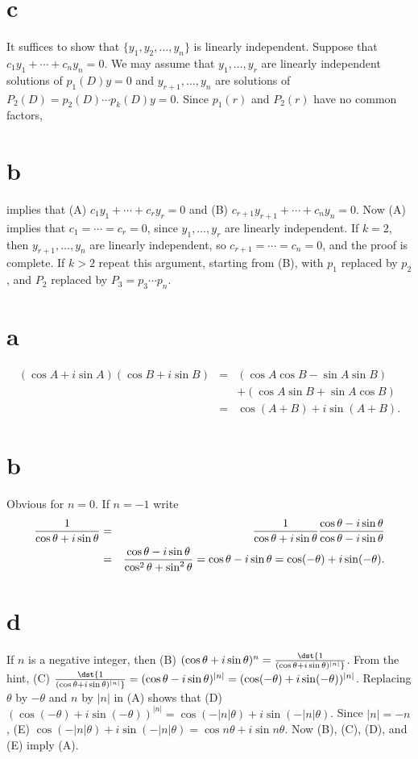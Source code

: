 \documentclass[dvips]{book}
\renewcommand{\exer}[1]{\par\medskip\;\noindent{\color{red}\bf #1.}}
\numberwithin{example}{section}
\numberwithin{equation}{section}
\numberwithin{theorem}{section}
\numberwithin{table}{section}
\numberwithin{figure}{section}
\begin{document}
\part{c} It suffices to show that
 $\{y_1,y_2,\dots,y_n\}$ is linearly independent. Suppose that
$c_1y_1+\cdots+c_ny_n=0$. We may assume that $y_1,\dots,y_r$
are linearly independent solutions of $p_1(D)y=0$ and
$y_{r+1},\dots,y_n$ are solutions of
$P_2(D)=p_2(D)\cdots p_k(D)y=0$. Since $p_1(r)$ and $P_2(r)$ have no
common factors,
\part{b} implies
that (A) $c_1y_1+\cdots+c_ry_r=0$ and
(B) $c_{r+1}y_{r+1}+\cdots+c_ny_n=0$.
Now (A) implies that $c_1=\cdots=c_r=0$, since $y_1,\dots,y_r$
are linearly independent. If $k=2$, then $y_{r+1},\dots,y_n$
are linearly independent, so $c_{r+1}=\cdots=c_n=0$, and the proof is
complete. If $k>2$ repeat this argument, starting from (B), with $p_1$
replaced by $p_2$, and $P_2$ replaced by $P_3=p_3\cdots p_n$.


\exer{9.2.42}
\part{a}
\begin{eqnarray*}
(\cos A+i\sin A)(\cos B+i\sin B)&=&(\cos A\cos B-\sin A\sin B)
\\&&+(\cos A\sin B+\sin A\cos B)\\
&=&\cos(A+B)+i\sin(A+B).
\end{eqnarray*}

\part{b} Obvious for $n=0$. If $n=-1$ write
\begin{eqnarray*}
{1\over\cos\theta+i\sin\theta}&=&{1\over\cos\theta+i\sin\theta}
{\cos\theta-i\sin\theta\over\cos\theta-i\sin\theta}\\
&=&{\cos\theta-i\sin\theta\over\cos^2\theta+\sin^2\theta}=
\cos\theta-i\sin\theta=\cos(-\theta)+i\sin(-\theta).
\end{eqnarray*}

\part{d} If $n$ is a negative integer, then
(B)
$(\cos\theta+i\sin\theta)^n=\dst{1\over(\cos\theta+i\sin\theta)^{|n|}}$.
From the hint,
(C)
$\dst{1\over(\cos\theta+i\sin\theta)^{|n|}}=(\cos\theta-i\sin\theta)^{|n|}
=(\cos(-\theta)+i\sin(-\theta))^{|n|}$.
Replacing $\theta$ by $-\theta$ and $n$ by $|n|$ in (A) shows that
(D)
$(\cos(-\theta)+i\sin(-\theta))^{|n|}=\cos(-|n|\theta)+i\sin(-|n|\theta)$.
Since $|n|=-n$, (E)
$\cos(-|n|\theta)+i\sin(-|n|\theta)=\cos n\theta+i\sin n\theta$. Now
(B), (C), (D), and (E) imply (A).
\end{document}
